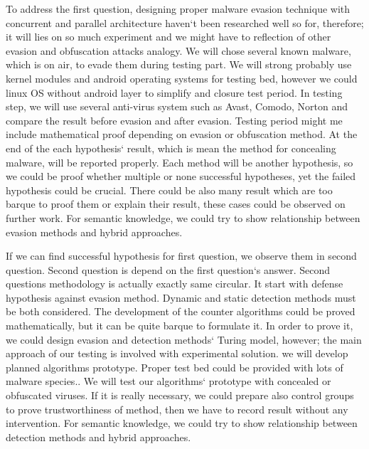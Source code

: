 

To address the first question, designing proper malware evasion technique with concurrent and parallel architecture haven`t been researched well so for, therefore; it will lies on so much experiment and we might have to reflection of other evasion and obfuscation attacks analogy.  We will chose several known malware, which is on air, to  evade them during testing part. We will strong probably use kernel modules and android operating systems for testing bed, however we could linux OS without android layer to simplify and closure test period. In testing step, we will use several anti-virus system such as Avast, Comodo, Norton and compare the result before evasion and after evasion. Testing period might me include mathematical proof depending on evasion or obfuscation method. At the end of the each hypothesis` result, which is mean the method for concealing malware, will be reported properly. Each method will be another hypothesis, so we could be proof whether multiple or none successful hypotheses, yet the failed hypothesis could be crucial. There could be also many result which are too barque to proof them or explain their result, these cases could be observed on further work. For semantic knowledge, we could try to show relationship between evasion methods and hybrid approaches.

If we can find successful hypothesis for first question, we observe them in second question. Second question is depend on the first question`s answer. Second questions methodology is actually exactly same circular. It start with defense hypothesis against evasion method. Dynamic and static detection methods must be both considered. The development of the counter algorithms could be proved mathematically, but it can be quite barque to formulate it. In order to prove it, we could design evasion and detection methods` Turing model, however; the main approach of our testing is involved with experimental solution. we will develop planned algorithms prototype. Proper test bed could be provided with lots of malware species.. We will test our algorithms` prototype with concealed or obfuscated viruses. If it is really necessary, we could prepare also control groups to prove trustworthiness of method, then we have to record result without any intervention. For semantic knowledge, we could try to show relationship between detection methods and hybrid approaches.
\newpage

